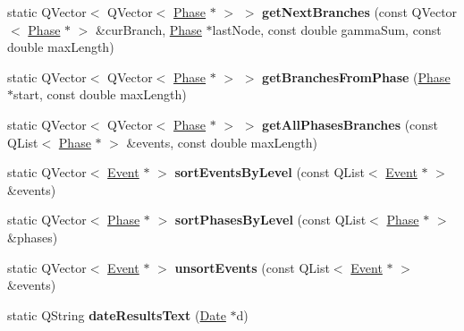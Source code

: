 \begin{DoxyCompactItemize}
\item 
\hypertarget{class_model_utilities_a7f6730d48e3f2c3717a9aa3c65c47956}{static Q\-Vector$<$ Q\-Vector$<$ \hyperlink{class_phase}{Phase} $\ast$ $>$ $>$ {\bfseries get\-Next\-Branches} (const Q\-Vector$<$ \hyperlink{class_phase}{Phase} $\ast$ $>$ \&cur\-Branch, \hyperlink{class_phase}{Phase} $\ast$last\-Node, const double gamma\-Sum, const double max\-Length)}\label{class_model_utilities_a7f6730d48e3f2c3717a9aa3c65c47956}

\item 
\hypertarget{class_model_utilities_a8724f12d182f69f9a1eec3c5646a887d}{static Q\-Vector$<$ Q\-Vector$<$ \hyperlink{class_phase}{Phase} $\ast$ $>$ $>$ {\bfseries get\-Branches\-From\-Phase} (\hyperlink{class_phase}{Phase} $\ast$start, const double max\-Length)}\label{class_model_utilities_a8724f12d182f69f9a1eec3c5646a887d}

\item 
\hypertarget{class_model_utilities_ad4aad30e928250f7e38dbe6b0c6c3252}{static Q\-Vector$<$ Q\-Vector$<$ \hyperlink{class_phase}{Phase} $\ast$ $>$ $>$ {\bfseries get\-All\-Phases\-Branches} (const Q\-List$<$ \hyperlink{class_phase}{Phase} $\ast$ $>$ \&events, const double max\-Length)}\label{class_model_utilities_ad4aad30e928250f7e38dbe6b0c6c3252}

\item 
\hypertarget{class_model_utilities_a363ffbf2268dfe32ac7af0a89bedc880}{static Q\-Vector$<$ \hyperlink{class_event}{Event} $\ast$ $>$ {\bfseries sort\-Events\-By\-Level} (const Q\-List$<$ \hyperlink{class_event}{Event} $\ast$ $>$ \&events)}\label{class_model_utilities_a363ffbf2268dfe32ac7af0a89bedc880}

\item 
\hypertarget{class_model_utilities_a57d256f2a506856b762ea1df74e5545c}{static Q\-Vector$<$ \hyperlink{class_phase}{Phase} $\ast$ $>$ {\bfseries sort\-Phases\-By\-Level} (const Q\-List$<$ \hyperlink{class_phase}{Phase} $\ast$ $>$ \&phases)}\label{class_model_utilities_a57d256f2a506856b762ea1df74e5545c}

\item 
\hypertarget{class_model_utilities_a7a9d7e6b9a0319c23d4b43f590a679f0}{static Q\-Vector$<$ \hyperlink{class_event}{Event} $\ast$ $>$ {\bfseries unsort\-Events} (const Q\-List$<$ \hyperlink{class_event}{Event} $\ast$ $>$ \&events)}\label{class_model_utilities_a7a9d7e6b9a0319c23d4b43f590a679f0}

\item 
\hypertarget{class_model_utilities_a8fd5f2e93a1c993865e0afa0dfca51ab}{static Q\-String {\bfseries date\-Results\-Text} (\hyperlink{class_date}{Date} $\ast$d)}\label{class_model_utilities_a8fd5f2e93a1c993865e0afa0dfca51ab}


\end{DoxyCompactItemize}
